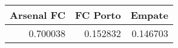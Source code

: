 \begin{tabular}{rrr}
\hline
   Arsenal FC &   FC Porto &   Empate \\
\hline
     0.700038 &   0.152832 & 0.146703 \\
\hline
\end{tabular}